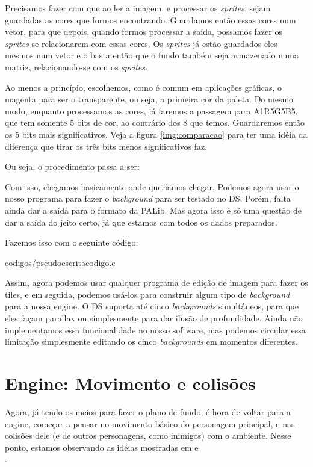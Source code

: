 Precisamos fazer com que ao ler a imagem, e processar os \textit{sprites}, sejam guardadas as cores que formos encontrando. Guardamos então essas cores num vetor, para que depois, quando formos processar a saída, possamos fazer os \textit{sprites} se relacionarem com essas cores. Os \textit{sprites} já estão guardados eles mesmos num vetor e o basta então que o fundo também seja armazenado numa matriz, relacionando-se com os \textit{sprites}.

Ao menos a princípio, escolhemos, como é comum em aplicações gráficas, o magenta para ser o transparente, ou seja, a primeira cor da paleta. Do mesmo modo, enquanto processamos as cores, já faremos a passagem para A1R5G5B5, que tem somente 5 bits de cor, ao contrário dos 8 que temos. Guardaremos então os 5 bits mais significativos. Veja a figura \ref{img:comparacao} para ter uma idéia da diferença que tirar os três bits menos significativos faz.

Ou seja, o procedimento passa a ser:



Com isso, chegamos basicamente onde queríamos chegar. Podemos agora usar o nosso programa para fazer o \textit{background} para ser testado no DS. Porém, falta ainda dar a saída para o formato da PALib. Mas agora isso é só uma questão de dar a saída do jeito certo, já que estamos com todos os dados preparados.

Fazemos isso com o seguinte código:


{codigos/pseudoescritacodigo.c}

Assim, agora podemos usar qualquer programa de edição de imagem para fazer os tiles, e em seguida, podemos usá-los para construir algum tipo de \textit{background} para a nossa engine. O DS suporta até cinco \textit{backgrounds} simultâneos, para que eles façam parallax ou simplesmente para dar ilusão de profundidade. Ainda não implementamos essa funcionalidade no nosso software, mas podemos circular essa limitação simplesmente editando os cinco \textit{backgrounds} em momentos diferentes.

\section{Engine: Movimento e colisões}

Agora, já tendo os meios para fazer o plano de fundo, é hora de voltar para a engine, começar a pensar no movimento básico do personagem principal, e nas colisões dele (e de outros personagens, como inimigos) com o ambiente. Nesse ponto, estamos observando as idéias mostradas em \cite[N Tutorial A]{NCollisionA} e \\\cite[N Tutorial B]{NCollisionB}.

